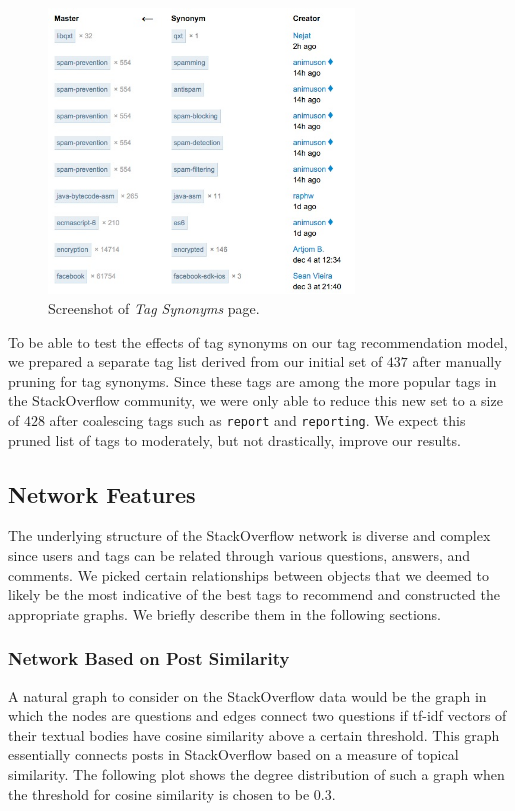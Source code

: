 \documentclass[11pt]{IEEEtran}
\begin{document}
\begin{figure}[h]
  \centering
    \includegraphics[width=3.2in]{tagsynonyms_so.jpg}
  \caption{Screenshot of \textit{Tag Synonyms} page.}
  \label{fig:syn}
\end{figure}

To be able to test the effects of tag synonyms on our tag recommendation model, we prepared a separate tag list derived from our initial set of $437$ after manually pruning for tag synonyms. Since these tags are among the more popular tags in the StackOverflow community, we were only able to reduce this new set to a size of $428$ after coalescing tags such as \texttt{report} and \texttt{reporting}. We expect this pruned list of tags to moderately, but not drastically, improve our results.

\subsection{Network Features}

The underlying structure of the StackOverflow network is diverse and complex since users and tags can be related through various questions, answers, and comments. We picked certain relationships between objects that we deemed to likely be the most indicative of the best tags to recommend and constructed the appropriate graphs. We briefly describe them in the following sections.

\subsubsection{Network Based on Post Similarity}

A natural graph to consider on the StackOverflow data would be the graph in which the nodes are questions and edges connect two questions if tf-idf vectors of their textual bodies have cosine similarity above a certain threshold. This graph essentially connects posts in StackOverflow based on a measure of topical similarity. The following plot shows the degree distribution of such a graph when the threshold for cosine similarity is chosen to be $0.3$.
\end{document}
